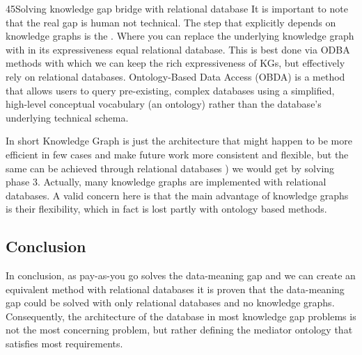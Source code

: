 \begin{question}{4}{5}{Solving knowledge gap bridge with relational database}
It is important to note that the real gap is human not technical. The step that explicitly depends on knowledge graphs is the . Where you can replace the underlying knowledge graph with in its expressiveness equal relational database. This is best done via ODBA methods \cite{poggi_linking_2008} with which we can keep the rich expressiveness of KGs, but effectively rely on relational databases. Ontology-Based Data Access (OBDA) is a method that allows users to query pre-existing, complex databases using a simplified, high-level conceptual vocabulary (an ontology) rather than the database's underlying technical schema.

In short Knowledge Graph is just the architecture that might happen to be more efficient in few cases and make future work more consistent and flexible, but the same can be achieved through relational databases \cite{sakr_relational_2010}) we would get by solving phase 3. Actually, many knowledge graphs are implemented with relational databases.
A valid concern here is that the main advantage of knowledge graphs is their flexibility, which in fact is lost partly with ontology based methods.

\subsection{Conclusion}

In conclusion, as pay-as-you go solves the data-meaning gap and we can create an equivalent method with relational databases it is proven that the data-meaning gap could be solved with only relational databases and no knowledge graphs. Consequently, the architecture of the database in most knowledge gap problems is not the most concerning problem, but rather defining the mediator ontology that satisfies most requirements.

\end{question}